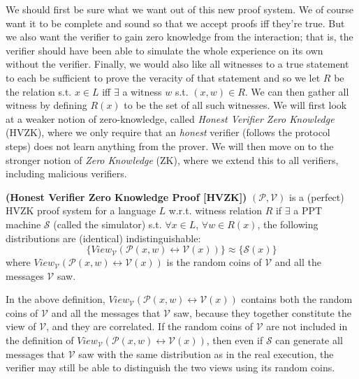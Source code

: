 		We should first be sure what we want out of this new proof system.  We of course want it to be complete and sound so that we accept proofs iff they're true.  But we also want the verifier to gain zero knowledge from the interaction; that is, the verifier should have been able to simulate the whole experience on its own without the verifier.
		Finally, we would also like all witnesses to a true statement to each be sufficient to prove the veracity of that statement and so we let $R$ be the relation s.t. $x \in L$ iff $\exists$ a witness $w$ s.t. $(x,w)\in R$.  We can then gather all witness by defining $R(x)$ to be the set of all such witnesses. We will first look at a weaker notion of zero-knowledge, called \textit{Honest Verifier Zero Knowledge} (HVZK), where we only require that an {\em honest} verifier (follows the protocol steps) does not learn anything from the prover. We will then move on to the stronger notion of \textit{Zero Knowledge} (ZK), where we extend this to all verifiers, including malicious verifiers.
		
		\begin{definition} {\normalfont\textbf{(Honest Verifier Zero Knowledge Proof [HVZK])}} 
			$(\mathcal{P},\mathcal{V})$ is a (perfect) HVZK proof system for a language $L$ w.r.t. witness relation $R$ if 
			$\exists$ a PPT machine $\mathcal{S}$ (called the simulator) s.t. $\forall x \in L$, $\forall w\in R(x)$, the following distributions are (identical) indistinguishable:
		$$\{View_{\mathcal{V}}(\mathcal{P}(x,w) \leftrightarrow \mathcal{V}(x))\} \approx \{\mathcal{S}(x)\}$$
		where $View_{\mathcal{V}}(\mathcal{P}(x,w) \leftrightarrow \mathcal{V}(x))$ is the random coins of $\mathcal{V}$ and all the messages $\mathcal{V}$ saw.
  \end{definition}

\begin{remark}
In the above definition, $View_{\mathcal{V}}(\mathcal{P}(x,w) \leftrightarrow \mathcal{V}(x))$ contains both the random coins of $\mathcal{V}$ and all the messages that $\mathcal{V}$ saw, because they together constitute the view of $\mathcal{V}$, and they are correlated. If the random coins of $\mathcal{V}$ are not included in the definition of $View_{\mathcal{V}}(\mathcal{P}(x,w) \leftrightarrow \mathcal{V}(x))$, then even if $\mathcal{S}$ can generate all messages that $\mathcal{V}$ saw with the same distribution as in the real execution, the verifier may still be able to distinguish the two views using its random coins.
\end{remark}

